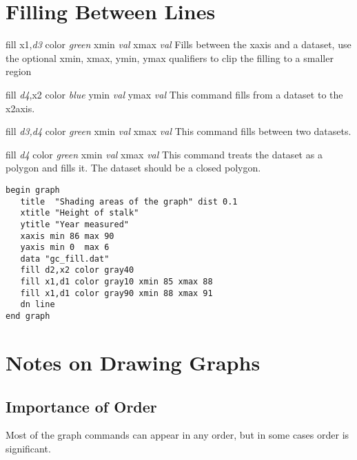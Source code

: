\section{Filling Between Lines}
\begin{commanddescription}
  
 
\item[{\sf fill x1,{\it d3} color {\it green}  xmin {\it val} xmax {\it val}} ]
Fills between the xaxis and a dataset, use the optional
{\sf xmin, xmax, ymin, ymax} qualifiers to clip the filling
to a smaller region

\item[{\sf fill {\it d4},x2 color {\it blue}   ymin {\it val} ymax {\it val}} ]
This command fills from a dataset to the x2axis.

\item[{\sf fill {\it d3,d4} color {\it green}  xmin {\it val} xmax {\it val}} ]
This command fills between two datasets.

\item[{\sf fill {\it d4} color {\it green}  xmin {\it val} xmax {\it val}} ]
This command treats the dataset as a polygon and fills it. The dataset
should be a closed polygon.

\begin{minipage}[c]{8cm}
\begin{Verbatim}
begin graph
   title  "Shading areas of the graph" dist 0.1
   xtitle "Height of stalk"
   ytitle "Year measured"
   xaxis min 86 max 90
   yaxis min 0  max 6
   data "gc_fill.dat"
   fill d2,x2 color gray40 
   fill x1,d1 color gray10 xmin 85 xmax 88
   fill x1,d1 color gray90 xmin 88 xmax 91
   dn line
end graph
\end{Verbatim}
\end{minipage}
\hfill
\begin{minipage}[c]{7cm}
\mbox{}
\end{minipage}

\end{commanddescription}

\section{Notes on Drawing Graphs}

\subsection{Importance of Order}
Most of the graph commands can appear in any order, but in some
cases order is significant.

